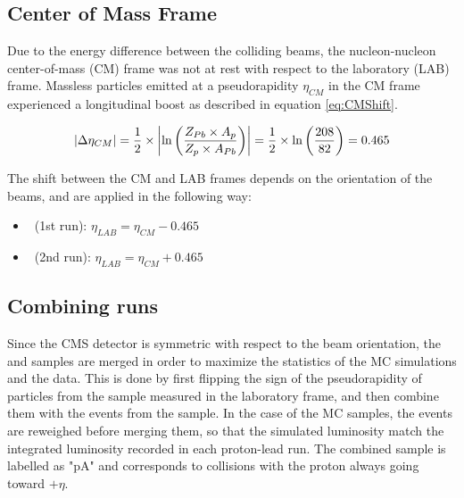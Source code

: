 \subsection{Center of Mass Frame} \label{sec:WBoson_Sample_CMFrame}
  
Due to the energy difference between the \pPb colliding beams, the nucleon-nucleon center-of-mass (CM) frame was not at rest with respect to the laboratory (LAB) frame. Massless particles emitted at a pseudorapidity $\eta_{CM}$ in the CM frame experienced a longitudinal boost as described in equation \ref{eq:CMShift}.

\begin{equation}
\lvert \Delta{\eta}_{CM} \rvert = \frac{1}{2}\times\left|\ln\left(\frac{Z_{Pb}\times A_{p}}{Z_{p}\times A_{Pb}}\right)\right| = \frac{1}{2}\times\ln\left(\frac{208}{82}\right) = 0.465
\label{eq:CMShift}
\end{equation}

The shift between the CM and LAB frames depends on the orientation of the beams, and are applied in the following way:

\begin{itemize}
\item \RunPbp\ (1st run): $\eta_{LAB} = \eta_{CM} - 0.465$
\item \RunpPb\ (2nd run): $\eta_{LAB} = \eta_{CM} + 0.465$
\end{itemize}


\subsection{Combining \pPb runs} \label{sec:WBoson_Sample_CombiningBeamDirection}

Since the CMS detector is symmetric with respect to the beam orientation, the \RunpPb and \RunPbp samples are merged in order to maximize the statistics of the MC simulations and the data. This is done by first flipping the sign of the pseudorapidity of particles from the \RunPbp sample measured in the laboratory frame, and then combine them with the events from the \RunpPb sample. In the case of the MC samples, the events are reweighed before merging them, so that the simulated luminosity match the integrated luminosity recorded in each proton-lead run. The combined sample is labelled as "pA" and corresponds to \pPb collisions with the proton always going toward $+\eta$.






